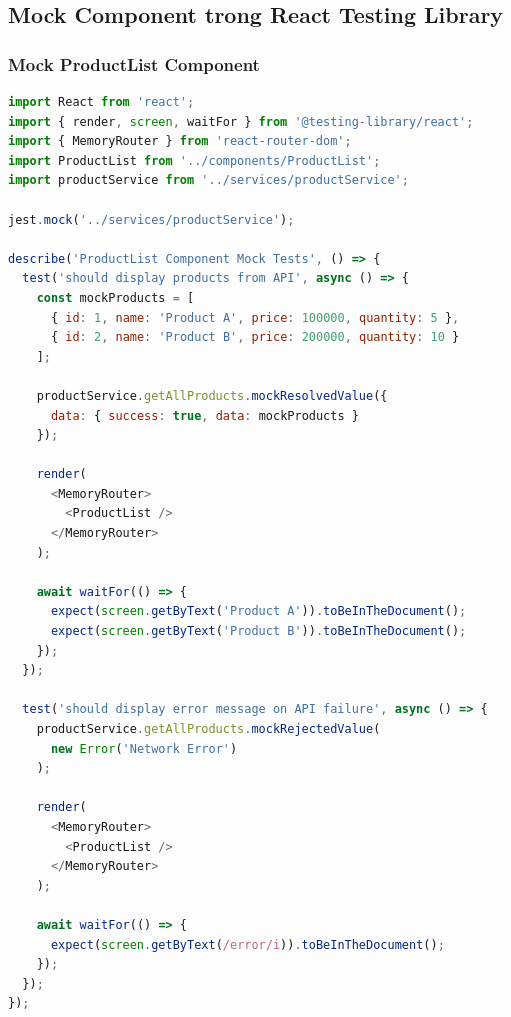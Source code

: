 \subsection{Mock Component trong React Testing Library}

\subsubsection{Mock ProductList Component}
\begin{lstlisting}[language=JavaScript, caption=ProductList Mock Test]
import React from 'react';
import { render, screen, waitFor } from '@testing-library/react';
import { MemoryRouter } from 'react-router-dom';
import ProductList from '../components/ProductList';
import productService from '../services/productService';

jest.mock('../services/productService');

describe('ProductList Component Mock Tests', () => {
  test('should display products from API', async () => {
    const mockProducts = [
      { id: 1, name: 'Product A', price: 100000, quantity: 5 },
      { id: 2, name: 'Product B', price: 200000, quantity: 10 }
    ];

    productService.getAllProducts.mockResolvedValue({
      data: { success: true, data: mockProducts }
    });

    render(
      <MemoryRouter>
        <ProductList />
      </MemoryRouter>
    );

    await waitFor(() => {
      expect(screen.getByText('Product A')).toBeInTheDocument();
      expect(screen.getByText('Product B')).toBeInTheDocument();
    });
  });

  test('should display error message on API failure', async () => {
    productService.getAllProducts.mockRejectedValue(
      new Error('Network Error')
    );

    render(
      <MemoryRouter>
        <ProductList />
      </MemoryRouter>
    );

    await waitFor(() => {
      expect(screen.getByText(/error/i)).toBeInTheDocument();
    });
  });
});
\end{lstlisting}

